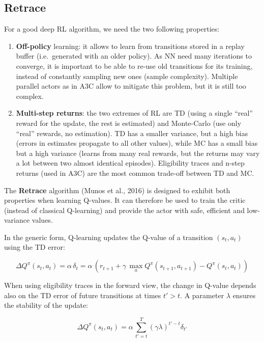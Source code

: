 \documentclass[
  letterpaper,
  DIV=11,
  numbers=noendperiod]{scrreprt}
\begin{document}
\hypertarget{retrace}{%
\subsection{Retrace}\label{retrace}}

For a good deep RL algorithm, we need the two following properties:

\begin{enumerate}
\def\labelenumi{\arabic{enumi}.}
\item
  \textbf{Off-policy} learning: it allows to learn from transitions
  stored in a replay buffer (i.e.~generated with an older policy). As NN
  need many iterations to converge, it is important to be able to re-use
  old transitions for its training, instead of constantly sampling new
  ones (sample complexity). Multiple parallel actors as in A3C allow to
  mitigate this problem, but it is still too complex.
\item
  \textbf{Multi-step returns}: the two extremes of RL are TD (using a
  single ``real'' reward for the update, the rest is estimated) and
  Monte-Carlo (use only ``real'' rewards, no estimation). TD has a
  smaller variance, but a high bias (errors in estimates propagate to
  all other values), while MC has a small bias but a high variance
  (learns from many real rewards, but the returns may vary a lot between
  two almost identical episodes). Eligibility traces and n-step returns
  (used in A3C) are the most common trade-off between TD and MC.
\end{enumerate}

The \textbf{Retrace} algorithm (Munos et al., 2016) is designed to
exhibit both properties when learning Q-values. It can therefore be used
to train the critic (instead of classical Q-learning) and provide the
actor with safe, efficient and low-variance values.

In the generic form, Q-learning updates the Q-value of a transition
\((s_t, a_t)\) using the TD error:

\[
    \Delta Q^\pi(s_t, a_t) = \alpha \, \delta_t = \alpha \, (r_{t+1} + \gamma \, \max_a Q^\pi(s_{t+1}, a_{t+1}) - Q^\pi(s_t, a_t))
\]

When using eligibility traces in the forward view, the change in Q-value
depends also on the TD error of future transitions at times \(t' > t\).
A parameter \(\lambda\) ensures the stability of the update:

\[
    \Delta Q^\pi(s_t, a_t) = \alpha \, \sum_{t'=t}^T (\gamma \lambda)^{t'-t} \delta_{t'}
\]
\end{document}
